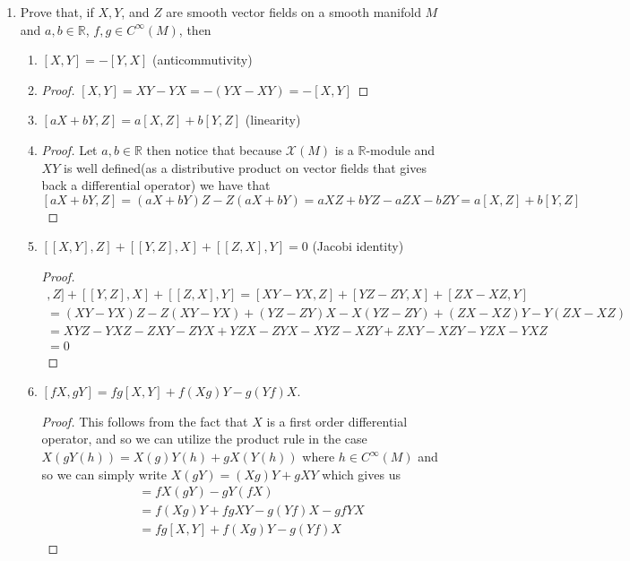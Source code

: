 \documentclass[11pt]{article}
\theoremstyle{definition}
\theoremstyle{definition}
\newcommand{\R}{{\mathbb R}}
\begin{document}
\begin{enumerate}
	\item Prove that, if $X, Y$, and $Z$ are smooth vector fields on a smooth manifold $M$ and $a,b \in \R$, $f,g \in C^\infty (M)$, then
	\begin{enumerate}
		\item $[X,Y] = -[Y,X]$ (anticommutivity)
		\item \begin{proof}
			$[X,Y]=XY-YX=-(YX-XY)=-[X,Y]$
		\end{proof}
		\item $[aX+bY,Z] = a[X,Z]+b[Y,Z]$ (linearity)
		\item 
		\begin{proof}
		Let $a,b\in\R$ then notice that because $\mathcal X(M)$ is a $\R$-module and $XY$ is well 
		defined(as a distributive product on vector fields that gives back a differential operator) we have that 
		$[aX+bY,Z]=(aX+bY)Z-Z(aX+bY)=aXZ+bYZ-aZX-bZY=a[X,Z]+b[Y,Z]$	
		\end{proof}
		\item $[[X,Y],Z] + [[Y,Z],X] + [[Z,X],Y] = 0$ (Jacobi identity)
		\begin{proof}
			\begin{multline*}
				[[X,Y],Z] + [[Y,Z],X] + [[Z,X],Y] = [XY-YX,Z] + [YZ-ZY,X] + [ZX-XZ,Y]\\
				= (XY-YX)Z-Z(XY-YX) + (YZ-ZY)X-X(YZ-ZY) + (ZX-XZ)Y-Y(ZX-XZ)\\
				= XYZ-YXZ-ZXY-ZYX + YZX-ZYX-XYZ-XZY + ZXY-XZY-YZX-YXZ\\
				= 0
			\end{multline*}
		\end{proof}
		\item $[fX,gY] = fg[X,Y] + f(Xg)Y - g(Yf)X$.
		\begin{proof}
			This follows from the fact that $X$ is a first order differential operator, and so we can utilize the product rule in the case 
			$X(gY(h))=X(g)Y(h)+gX(Y(h))$ where $h\in C^\infty(M)$ and so we can simply write $X(gY)=(Xg)Y+gXY$ which gives us
			\begin{align*}
				[fX,gY] &= fX(gY)-gY(fX)\\
				&= f(Xg)Y+fgXY-g(Yf)X-gfYX\\
				&= fg[X,Y] + f(Xg)Y - g(Yf)X
			\end{align*}
		\end{proof}
	\end{enumerate}
	
\end{enumerate}


	
	
\end{document}
